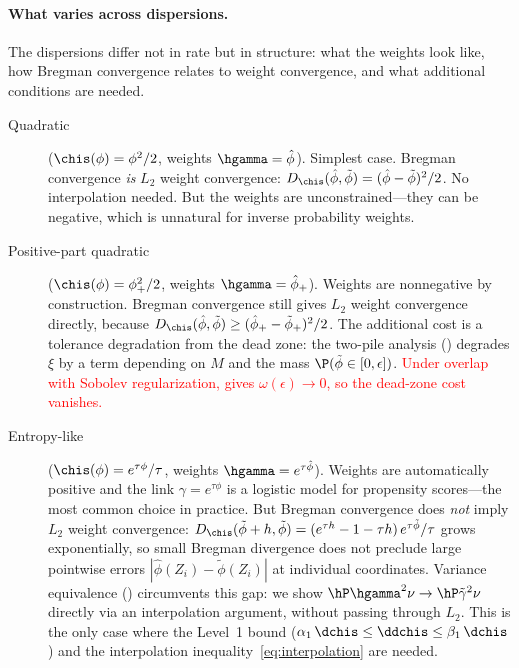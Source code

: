 \documentclass{article}
\begin{document}
\paragraph{What varies across dispersions.}
The dispersions differ not in rate
but in structure:
what the weights look like,
how Bregman convergence relates
to weight convergence,
and what additional conditions are needed.
\begin{description}
\item[Quadratic] ($\chis(\phi) = \phi^2/2$,
weights $\hgamma = \hat\phi$).
Simplest case.
Bregman convergence \emph{is} $L_2$ weight convergence:
$D_{\chis}(\hat\phi, \tilde\phi)
  = (\hat\phi - \tilde\phi)^2/2$.
No interpolation needed.
But the weights are unconstrained---they
can be negative,
which is unnatural for inverse probability weights.
\item[Positive-part quadratic]
($\chis(\phi) = \phi_+^2/2$,
weights $\hgamma = \hat\phi_+$).
Weights are nonnegative by construction.
Bregman convergence still gives
$L_2$ weight convergence directly,
because $D_{\chis}(\hat\phi, \tilde\phi)
  \ge (\hat\phi_+ - \tilde\phi_+)^2/2$.
The additional cost is a tolerance degradation
from the dead zone:
the two-pile analysis ()
degrades $\xi$ by a term depending on $M$
and the mass $\P(\tilde\phi \in [0,\epsilon])$.
\textcolor{red}{Under overlap with Sobolev regularization,
gives $\omega(\epsilon) \to 0$,
so the dead-zone cost vanishes.}%
\item[Entropy-like]
($\chis(\phi) = e^{\tau\phi}/\tau$,
weights $\hgamma = e^{\tau\hat\phi}$).
Weights are automatically positive
and the link $\gamma = e^{\tau\phi}$
is a logistic model for propensity scores---the
most common choice in practice.
But Bregman convergence does \emph{not}
imply $L_2$ weight convergence:
$D_{\chis}(\tilde\phi+h, \tilde\phi)
  = (e^{\tau h} - 1 - \tau h)\,
    e^{\tau\tilde\phi}/\tau$
grows exponentially,
so small Bregman divergence does not preclude
large pointwise errors
$|\hat\phi(Z_i) - \tilde\phi(Z_i)|$
at individual coordinates.
Variance equivalence
()
circumvents this gap:
we show $\hP \hgamma^2 \nu \to \hP \tilde\gamma^2 \nu$
directly via an interpolation argument,
without passing through $L_2$.
This is the only case
where the Level~1 bound
($\alpha_1\,\dchis \le \ddchis \le \beta_1\,\dchis$)
and the interpolation inequality~\eqref{eq:interpolation}
are needed.
\end{description}
\end{document}
